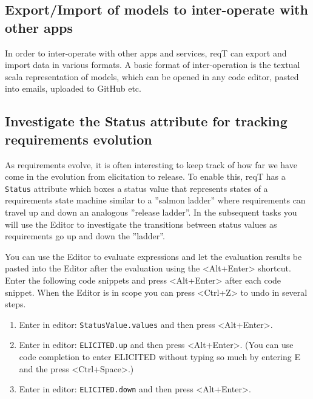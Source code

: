 \documentclass[11pt]{article}
\begin{document}
\subsection{Export/Import of models to inter-operate with other apps}

In order to inter-operate with other apps and services, reqT can export and import data in various formats. A basic format of inter-operation is the textual scala representation of models, which can be opened in any code editor, pasted into emails, uploaded to GitHub etc.   



\subsection{Investigate the Status attribute for tracking requirements evolution}

As requirements evolve, it is often interesting to keep track of how far we have come in the evolution from elicitation to release. To enable this, reqT has a \verb+Status+ attribute which boxes a status value that  represents states of a requirements state machine similar to a ''salmon ladder'' where requirements can travel up and down an analogous ''release ladder''. In the subsequent tasks you will use the Editor to investigate the transitions between status values as requirements go up and down the ''ladder''.  

\begin{framed}
\noindent You can use the Editor to evaluate expressions and let the evaluation results be pasted into the Editor after the evaluation using the <Alt+Enter> shortcut. Enter the following code snippets and press <Alt+Enter> after each code snippet. When the Editor is in scope you can press <Ctrl+Z> to undo in several steps.
\begin{enumerate}
\item Enter in editor: \verb+StatusValue.values+ and then press <Alt+Enter>.
\item Enter in editor: \verb+ELICITED.up+ and then press <Alt+Enter>. (You can use code completion to enter ELICITED without typing so much by entering E and the press <Ctrl+Space>.)
\item Enter in editor: \verb+ELICITED.down+ and then press <Alt+Enter>.
\end{enumerate}
\end{framed}
\end{document}
